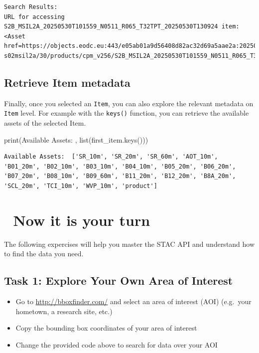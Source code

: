 \documentclass[
  letterpaper,
  DIV=11,
  numbers=noendperiod]{scrreprt}
\newenvironment{Shaded}{\begin{snugshade}}{\end{snugshade}}
\newcommand{\BuiltInTok}[1]{\textcolor[rgb]{0.00,0.23,0.31}{#1}}
\newcommand{\NormalTok}[1]{\textcolor[rgb]{0.00,0.23,0.31}{#1}}
\newcommand{\StringTok}[1]{\textcolor[rgb]{0.13,0.47,0.30}{#1}}
\providecommand{\tightlist}{%
  \setlength{\itemsep}{0pt}\setlength{\parskip}{0pt}}
\begin{document}
\begin{verbatim}
Search Results:
URL for accessing S2B_MSIL2A_20250530T101559_N0511_R065_T32TPT_20250530T130924 item:   <Asset href=https://objects.eodc.eu:443/e05ab01a9d56408d82ac32d69a5aae2a:202505-s02msil2a/30/products/cpm_v256/S2B_MSIL2A_20250530T101559_N0511_R065_T32TPT_20250530T130924.zarr>
\end{verbatim}

\subsection{Retrieve Item metadata}\label{retrieve-item-metadata}

Finally, once you selected an \texttt{Item}, you can also explore the
relevant metadata on \texttt{Item} level. For example with the
\texttt{keys()} function, you can retrieve the available assets of the
selected Item.

\begin{Shaded}
\begin{Highlighting}[]
\BuiltInTok{print}\NormalTok{(}\StringTok{\textquotesingle{}Available Assets: \textquotesingle{}}\NormalTok{, }\BuiltInTok{list}\NormalTok{(first\_item.keys()))}
\end{Highlighting}
\end{Shaded}

\begin{verbatim}
Available Assets:  ['SR_10m', 'SR_20m', 'SR_60m', 'AOT_10m', 'B01_20m', 'B02_10m', 'B03_10m', 'B04_10m', 'B05_20m', 'B06_20m', 'B07_20m', 'B08_10m', 'B09_60m', 'B11_20m', 'B12_20m', 'B8A_20m', 'SCL_20m', 'TCI_10m', 'WVP_10m', 'product']
\end{verbatim}

\section{💪 Now it is your turn}\label{now-it-is-your-turn-2}

The following expercises will help you master the STAC API and
understand how to find the data you need.

\subsection{Task 1: Explore Your Own Area of
Interest}\label{task-1-explore-your-own-area-of-interest}

\begin{itemize}
\tightlist
\item
  Go to \url{http://bboxfinder.com/} and select an area of interest
  (AOI) (e.g.~your hometown, a research site, etc.)
\item
  Copy the bounding box coordinates of your area of interest
\item
  Change the provided code above to search for data over your AOI
\end{itemize}
\end{document}

